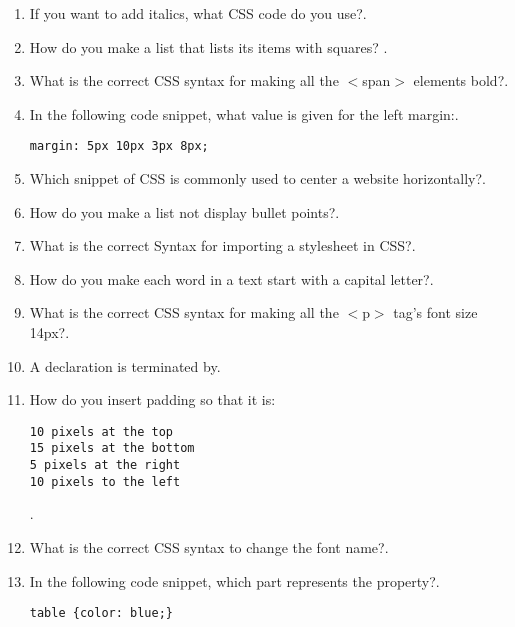 \documentclass[11pt,a4paper]{article}
\begin{document}
\begin{enumerate}
\item If you want to add italics, what CSS code do you use?\underline{\hspace{3cm}}.

\item How do you make a list that lists its items with squares?  \underline{\hspace{3cm}}.

\item What is the correct CSS syntax for making all the $<$span$>$ elements bold?\underline{\hspace{3cm}}.

\item In the following code snippet, what value is given for the left margin:\underline{\hspace{3cm}}.
\begin{lstlisting}
margin: 5px 10px 3px 8px;
\end{lstlisting}

\item Which snippet of CSS is commonly used to center a website horizontally?\underline{\hspace{3cm}}.

\item How do you make a list not display bullet points?\underline{\hspace{3cm}}.

\item What is the correct Syntax for importing a stylesheet in CSS?\underline{\hspace{3cm}}.

\item How do you make each word in a text start with a capital letter?\underline{\hspace{3cm}}.

\item What is the correct CSS syntax for making all the $<$p$>$ tag's font size 14px?\underline{\hspace{3cm}}.

\item A declaration is terminated by\underline{\hspace{3cm}}.

\item How do you insert padding so that it is:
\begin{lstlisting}
10 pixels at the top
15 pixels at the bottom
5 pixels at the right
10 pixels to the left
\end{lstlisting}
\underline{\hspace{3cm}}.
\item What is the correct CSS syntax to change the font name?\underline{\hspace{3cm}}.

\item In the following code snippet, which part represents the property?\underline{\hspace{3cm}}.
\begin{lstlisting}
table {color: blue;}
\end{lstlisting}

\end{enumerate}
\end{document}
